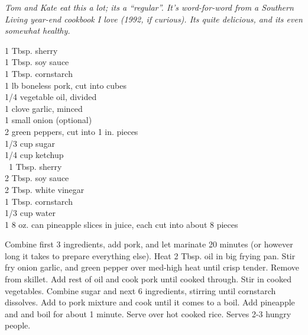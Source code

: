 \textit{Tom and Kate eat this a lot; its a ``regular''. It's 
word-for-word from a Southern Living year-end cookbook I
love (1992, if curious). Its quite delicious, and its even somewhat 
healthy.}
\begin{ingredients}
1 Tbsp. sherry\\
1 Tbsp. soy sauce\\
1 Tbsp. cornstarch\\
1 lb boneless pork, cut into cubes\\
1/4 vegetable oil, divided\\
1 clove garlic, minced\\
1 small onion (optional)\\
2 green peppers, cut into 1 in. pieces\\
1/3 cup sugar\\
1/4 cup ketchup\\\
1 Tbsp. sherry\\
2 Tbsp. soy sauce\\
2 Tbsp. white vinegar\\
1 Tbsp. cornstarch\\
1/3 cup water\\
1 8 oz. can pineapple slices in juice, each cut into about 8 pieces
\end{ingredients}
Combine first 3 ingredients, add pork, and let marinate 20 minutes (or however
long it takes to prepare everything else). Heat 2 Tbsp. oil in big frying pan.
Stir fry onion garlic, and green pepper over med-high heat until crisp tender.
Remove from skillet. Add rest of oil and cook pork until cooked through.
Stir in cooked vegetables. Combine sugar and next 6 ingredients, stirring
until cornstarch dissolves. Add to pork mixture and cook until it comes to
a boil. Add pineapple and and boil for about 1 minute. Serve over hot
cooked rice. Serves 2-3 hungry people.
